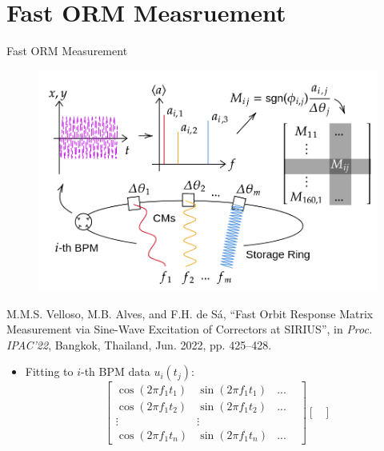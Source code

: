 \documentclass[aspectratio=169]{beamer}
\begin{document}
\section{Fast ORM Measruement}
\begin{frame}{Fast ORM Measurement}
    \begin{minipage}{0.44\textwidth}
        \begin{figure}
            \centering
            \includegraphics[width=\textwidth]{MOPOTK002_f1.png}
        \end{figure}
        \tiny
        M.M.S. Velloso, M.B. Alves, and F.H. de Sá,
   \textquotedblleft{Fast Orbit Response Matrix Measurement via Sine-Wave Excitation of Correctors at SIRIUS}\textquotedblright, in \emph{Proc. IPAC'22}, Bangkok, Thailand, Jun. 2022, pp. 425--428.
    \end{minipage}
    \begin{minipage}{0.55\textwidth}
        \begin{itemize}
            \scriptsize
            \item Fitting to $i$-th BPM data $u_i(t_j)$:
                \begin{equation*}
                    \begin{bmatrix}
                        \cos (2\pi f_{1} t_{1}) & \sin( 2\pi f_{1} t_{1}) & ... &\\
                        \cos (2\pi f_{1} t_{2}) & \sin (2\pi f_{1} t_{2}) & ...& \\
                        \vdots  & \vdots  & & \\
                        \cos (2\pi f_{1} t_{n}) & \sin (2\pi f_{1} t_{n}) & ... &
                        \end{bmatrix}\begin{bmatrix}

\end{bmatrix}
\end{equation*}
\end{itemize}
\end{minipage}
\end{frame}
\end{document}
